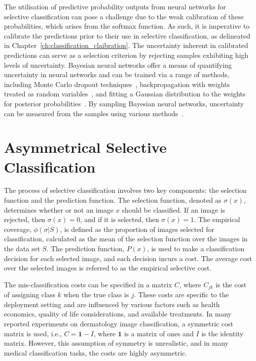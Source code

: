 The utilisation of predictive probability outputs from neural networks for selective classification can pose a challenge due to the weak calibration of these probabilities, which arises from the softmax function. As such, it is imperative to calibrate the predictions prior to their use in selective classification, as delineated in Chapter~\ref{ch:classification_claibration}. The uncertainty inherent in calibrated predictions can serve as a selection criterion by rejecting samples exhibiting high levels of uncertainty. Bayesian neural networks offer a means of quantifying uncertainty in neural networks and can be trained via a range of methods, including Monte Carlo dropout techniques~\citep{gal2016dropout}, backpropagation with weights treated as random variables~\citep{blundell2015weight}, and fitting a Gaussian distribution to the weights for posterior probabilities~\citep{mackay1992bayesian}. By sampling Bayesian neural networks, uncertainty can be measured from the samples using various methods~\citep{gal2016uncertainty}.



\section{Asymmetrical Selective Classification}
\label{sec:selective_classification}
The process of selective classification involves two key components: the selection function and the prediction function. The selection function, denoted as $\sigma(x)$, determines whether or not an image $x$ should be classified. If an image is rejected, then $\sigma(x)=0$, and if it is selected, then $\sigma(x)=1$. The empirical coverage, $\phi(\sigma|S)$, is defined as the proportion of images selected for classification, calculated as the mean of the selection function over the images in the data set $S$. The prediction function, $P(x)$, is used to make a classification decision for each selected image, and each decision incurs a cost. The average cost over the selected images is referred to as the empirical selective cost.

The mis-classification costs can be specified in a matrix $C$, where $C_{jk}$ is the cost of assigning class $k$ when the true class is $j$. These costs are specific to the deployment setting and are influenced by various factors such as health economics, quality of life considerations, and available treatments. In many reported experiments on dermatology image classification, a symmetric cost matrix is used, i.e., $C = \mathbf{1} - I$, where $\mathbf{1}$ is a matrix of ones and $I$ is the identity matrix. However, this assumption of symmetry is unrealistic, and in many medical classification tasks, the costs are highly asymmetric.

